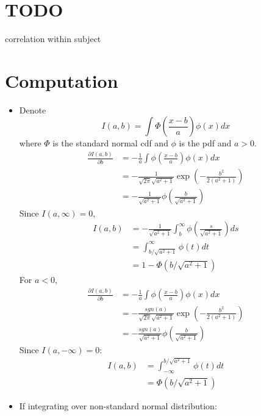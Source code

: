 \documentclass[12pt]{article}
\begin{document}
\section{TODO}

correlation within subject

\section{Computation}
\begin{itemize}
\item Denote
  \begin{displaymath}
    I(a,b) = \int \Phi \left( \frac{x-b}{a} \right)\phi(x) dx 
  \end{displaymath}
  where $\Phi$ is the standard normal cdf and $\phi$ is the pdf and $a > 0$.
  \begin{align*}
    \frac{\partial I(a,b)}{\partial b} & = - \frac{1}{a} \int \phi \left( \frac{x-b}{a} \right) \phi(x) dx \\
    & = - \frac{1}{\sqrt{2 \pi} \sqrt{a^2+1}} \exp \left( - \frac{b^2}{2(a^2+1)} \right)\\
    & = -\frac{1}{\sqrt{a^2+1}} \phi \left( \frac{b}{\sqrt{a^2+1}} \right)
  \end{align*}
  Since $I(a, \infty) = 0$,
  \begin{align}
    I(a,b) &= - \frac{1}{\sqrt{a^2+1}} \int_b^{\infty} \phi \left( \frac{s}{\sqrt{a^2+1}} \right) ds \nonumber \\
    &= \int_{b/\sqrt{a^2+1}}^{\infty} \phi(t) dt \nonumber\\
    \label{eq:int}
    & = 1- \Phi(b/\sqrt{a^2+1})
  \end{align}
  For $a < 0$,
  \begin{align*}
    \frac{\partial I(a,b)}{\partial b} & = - \frac{1}{a} \int \phi \left( \frac{x-b}{a} \right) \phi(x) dx \\
    & = - \frac{sgn(a)}{\sqrt{2 \pi} \sqrt{a^2+1}} \exp \left( - \frac{b^2}{2(a^2+1)} \right)\\
    & = -\frac{sgn(a)}{\sqrt{a^2+1}} \phi \left( \frac{b}{\sqrt{a^2+1}}
    \right)
  \end{align*}
  Since $I(a, -\infty) = 0$:
  \begin{align}
    I(a,b) &= \int^{b/\sqrt{a^2+1}}_{-\infty} \phi(t) dt \nonumber\\
    \label{eq:intneg}
    & = \Phi(b/\sqrt{a^2+1})
  \end{align}
\item If integrating over non-standard normal distribution:

\end{itemize}
\end{document}
